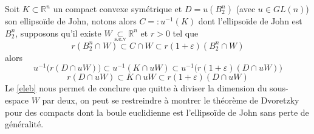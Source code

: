 \documentclass[12pt]{article}
\theoremstyle{definition}
\newcommand{\sev}{\underset{\text{s.e.v}}{\subset}}
\renewenvironment{leftbar}{%
	\def\FrameCommand{\vrule width 0.4pt \hspace{10pt}}%
	\MakeFramed {\advance\hsize-\width \FrameRestore}}%
{\endMakeFramed}
\begin{document}
\begin{leftbar}
\begin{rem}\label{rem0}
Soit $K\subset \mathbb{R}^n$ un compact convexe symétrique et $D=u(B_2^n)$ (avec $u\in GL(n)$) son ellipsoïde de John, notons alors $C=:u^{-1}(K)$ dont l'ellipsoïde de John est $B_2^n$, supposons qu'il existe $W\sev \mathbb{R}^n$ et $r>0$ tel que
\begin{equation*}
r (B_2^n\cap W)\subset C\cap W \subset r(1+\varepsilon)(B_2^n\cap W)
\end{equation*}
alors 
\begin{equation*}
u^{-1}\big(r(D\cap uW)\big)\subset u^{-1}(K\cap uW)\subset u^{-1}\big(r(1+\varepsilon)(D\cap uW)\big)
\end{equation*}
\begin{equation*}
r(D\cap uW)\subset K\cap uW \subset r(1+\varepsilon)(D\cap uW)
\end{equation*}
Le \cref{eleb} nous permet de conclure que quitte à diviser la dimension du sous-espace $W$ par deux, on peut se restreindre à montrer le théorème de Dvoretzky pour des compacts dont la boule euclidienne est l'ellipsoïde de John sans perte de généralité.
\end{rem}\end{leftbar}
\end{document}
